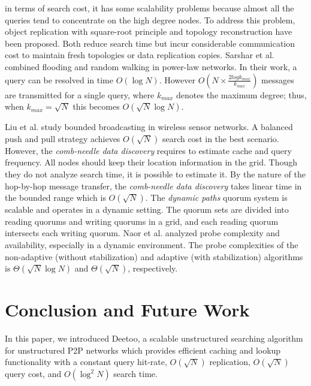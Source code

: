 \documentclass[conference]{IEEEtran}
\begin{document}
in terms of search cost, it has some
scalability problems because almost all the queries tend to concentrate
on the high degree nodes. To address this problem, object
replication with square-root principle\cite{CohenS02,LCKS02}
and topology reconstruction\cite{Cooper05} have been proposed. 
Both reduce search time but incur considerable communication cost 
to maintain fresh topologies or data replication copies. 
Sarshar et al. \cite{ns:percolation}
combined flooding and random walking in power-law networks. In their
work, a query can be resolved in time $O(\log N)$. However
$O(N\times \frac{2log k_{max}}{k_{max}})$ messages are
transmitted for a single query, where $k_{max}$ denotes the maximum
degree; thus, when $k_{max} = \sqrt{N}$ this becomes $O(\sqrt N \log N)$.

Liu et al. \cite{LiuHZ04} study bounded broadcasting in wireless sensor networks. 
A balanced push and pull strategy achieves $O(\sqrt N)$ search 
cost in the best scenario. However, the \emph{comb-needle data discovery}  
requires to estimate cache and query frequency.
All nodes should keep their location information in the grid. 
Though they do not analyze search time, it is possible to estimate it. By the
nature of the hop-by-hop message transfer, the \emph{comb-needle data discovery} 
takes linear time in the bounded range which is $O(\sqrt N)$. 
The \emph{dynamic paths} quorum system\cite{Naor05} 
is scalable and operates in a dynamic setting. The quorum sets are 
divided into reading quorums and writing quorums in a grid, and each 
reading quorum intersects each writing quorum. Naor et al. analyzed probe 
complexity and availability, especially in a dynamic environment. 
The probe complexities of the non-adaptive (without stabilization)
and adaptive (with stabilization) algorithms is 
$\Theta(\sqrt N \log N)$ and $\Theta(\sqrt N)$, respectively. 



\section{Conclusion and Future Work}
\label{sec:conclusion}
In this paper, we introduced Deetoo, a scalable unstructured searching
algorithm for unstructured P2P networks which provides efficient caching
and lookup functionality with a constant query hit-rate, $O(\sqrt N)$
replication, $O(\sqrt{N})$ query cost, and $O(\log^2 N)$ search time.
\end{document}
